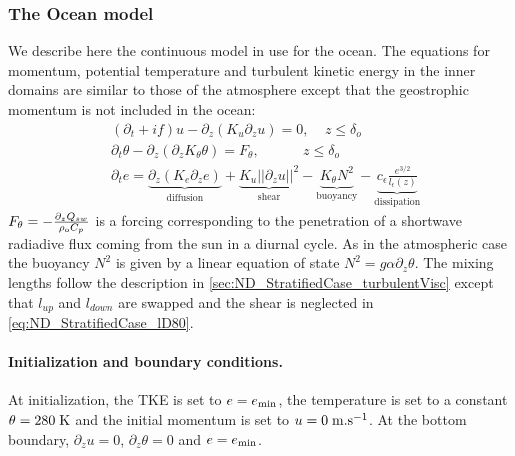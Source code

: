 \subsubsection{The Ocean model}
We describe here the continuous model in use for the ocean.
The equations for momentum, potential temperature and
turbulent kinetic energy in the inner domains are similar
to those of the atmosphere
except that the geostrophic momentum is not included in the ocean:
\begin{equation}
	\begin{aligned}
	&(\partial_t + if) u - \partial_z (K_u \partial_z u) = 0
		,~~~~~ z \leq \delta_{o} \\
	&\partial_t \theta -\partial_z (\partial_z K_{\theta} \theta)
	= F_{\theta},~~~~~~~~~~~~~~ z \leq \delta_{o} \\
		&\partial_t e =
    \underbrace{\partial_z \left(K_e
    \partial_z e\right)}_{\text{diffusion}}
    + \underbrace{K_u ||\partial_z u||^2}_{\text{shear}} 
    - \underbrace{K_{\theta} N^2 }_{\text{buoyancy}}
    - \underbrace{c_{\epsilon}
    \frac{e^{3/2}}{l_{\epsilon}(z)}}_{\text{dissipation}}
	\end{aligned}
\end{equation}
$F_\theta = -\frac{\partial_z Q_{sw}}{\rho_{\rm o} C_p}$ is a
forcing corresponding to the penetration of a shortwave radiadive
flux coming from the sun in a diurnal cycle.
As in the atmospheric case the buoyancy $N^2$ is
given by a linear equation of state
$N^2 = g \alpha \partial_z \theta$.
The mixing lengths follow the description in 
\ref{sec:ND_StratifiedCase_turbulentVisc}
except that $l_{up}$ and $l_{down}$ are swapped and the shear
is neglected in \eqref{eq:ND_StratifiedCase_lD80}.
%
\paragraph{Initialization and boundary conditions.}
At initialization, the TKE is set to $e=e_{\rm min}$, 
the temperature is set to a constant $\theta = 280 \; {\rm K}$
and the initial momentum is set to $u = 0 \; {\rm m}.{\rm s}^{-1}$.
At the bottom boundary,
$\partial_z u = 0$,
$\partial_z \theta = 0$ and $e=e_{\rm min}$.

